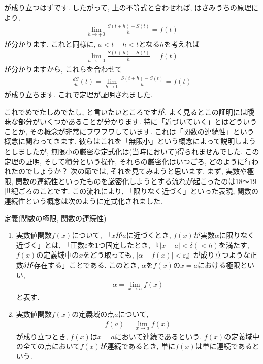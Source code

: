 が成り立つはずです. したがって, 上の不等式と合わせれば, はさみうちの原理により, 
\begin{eqnarray}
\lim_{h \to +0}\frac{S(t+h)-S(t)}{h} =f(t) \nonumber
\end{eqnarray}
が分かります. これと同様に, $a<t+h<t$となる$h$を考えれば
\begin{eqnarray}
\lim_{h \to -0}\frac{S(t+h)-S(t)}{h} =f(t) \nonumber
\end{eqnarray}
が分かりますから, これらを合わせて
\begin{eqnarray}
\frac{dS}{dt}(t)=\lim_{h \to 0}\frac{S(t+h)-S(t)}{h} =f(t) \nonumber
\end{eqnarray}
が成り立ちます. これで定理が証明されました. 
\par これでめでたしめでたし, と言いたいところですが, よく見るとこの証明には曖昧な部分がいくつかあることが分かります. 特に「近づいていく」とはどういうことか, その概念が非常にフワフワしています. これは「関数の連続性」という概念に関わってきます. 彼らはこれを「無限小」という概念によって説明しようとしましたが, 無限小の厳密な定式化は(当時において)得られませんでした. この定理の証明, そして積分という操作, それらの厳密化はいつごろ, どのように行われたのでしょうか？ 次の節では, それを見てみようと思います. 
まず, 実数や極限, 関数の連続性といったものを厳密化しようとする流れが起こったのは18〜19世紀ごろのことです. この流れにより, 「限りなく近づく」といった表現, 関数の連続性という概念は次のように定式化されました. 
\begin{itembox}[l]{定義(関数の極限, 関数の連続性)}
\begin{enumerate}
\item 実数値関数$f(x)$について, 「$x$が$a$に近づくとき, $f(x)$が実数$\alpha$に限りなく近づく」とは, 「正数$\varepsilon$を1つ固定したとき, 『$\left| x-a \right|<\delta(<h)$を満たす, $f(x)$の定義域中の$x$をどう取っても, $\left| \alpha -f(x) \right| <\varepsilon$』が成り立つような正数$\delta$が存在する」ことである. このとき, $\alpha$を$f(x)$の$x=a$における極限といい, 
\begin{eqnarray}
\alpha=\lim_{x \to a}f(x) \nonumber
\end{eqnarray}
と表す. 
\item 実数値関数$f(x)$の定義域の点$a$について, 
\begin{eqnarray}
f(a)=\lim_{x \to a}f(x) \nonumber
\end{eqnarray}
が成り立つとき, $f(x)$は$x=a$において連続であるという. $f(x)$の定義域中の全ての点において$f(x)$が連続であるとき, 単に$f(x)$は単に連続であるという. 
\end{enumerate}
\end{itembox}
